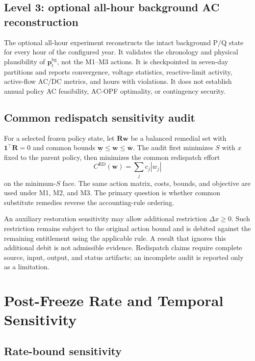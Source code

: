 \documentclass[10pt,journal,onecolumn]{IEEEtran}
\newcommand{\one}{\mathbf{1}}
\begin{document}
\subsection{Level 3: optional all-hour background AC reconstruction}

The optional all-hour experiment reconstructs the intact background P/Q state
for every hour of the configured year. It validates the chronology and
physical plausibility of $\bm p_t^{\mathrm{bg}}$, not the M1--M3 actions. It is
checkpointed in seven-day partitions and reports convergence, voltage
statistics, reactive-limit activity, active-flow AC/DC metrics, and hours with
violations. It does not establish annual policy AC feasibility, AC-OPF
optimality, or contingency security.

\subsection{Common redispatch sensitivity audit}

For a selected frozen policy state, let $\bm R\bm w$ be a balanced remedial
set with $\one^\top\bm R=0$ and common bounds
$\underline{\bm w}\leq\bm w\leq\overline{\bm w}$. The audit first minimizes
$S$ with $x$ fixed to the parent policy, then minimizes the common
redispatch effort
\begin{equation}
C^{\mathrm{RD}}(\bm w)=\sum_j c_j|w_j|
\end{equation}
on the minimum-$S$ face. The same action matrix, costs, bounds, and objective
are used under M1, M2, and M3. The primary question is whether common
substitute remedies reverse the accounting-rule ordering.

An auxiliary restoration sensitivity may allow additional restriction
$\Delta x\geq0$. Such restriction remains subject to the original action bound
and is debited against the remaining entitlement using the applicable rule.
A result that ignores this additional debit is not admissible evidence.
Redispatch claims require complete source, input, output, and status artifacts;
an incomplete audit is reported only as a limitation.

\section{Post-Freeze Rate and Temporal Sensitivity}
\label{sec:report_sensitivity}

\subsection{Rate-bound sensitivity}
\end{document}
